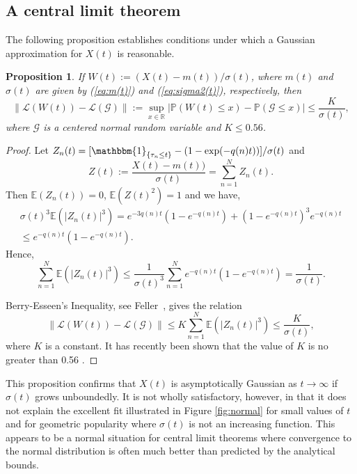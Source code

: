 \documentclass{amsart}
\newtheorem{proposition}{Proposition}
\def\R{{\mathbb R}}
\def\P{{\mathbb P}}
\def\E{{\mathbb E}}
\def\cal{\mathcal}
\newcommand\ind[1]{\mathbbm{1}_{\left\{#1\right\}}}
\begin{document}
\subsection{A central limit theorem}

The following proposition establishes conditions under which a Gaussian approximation for $X(t)$ is reasonable. 

\begin{proposition}\label{Central} If 
$W(t){:=}\left(X(t)-m(t)\right)/\sigma(t)$, where $m(t)$ and  $\sigma(t)$ are given by (\ref{eq:m(t)}) and (\ref{eq:sigma2(t)}), respectively, then
\[
\|{\cal L}(W(t))-{\cal L}({\cal G})\|  {:=}\sup_{x\in\R} \left|\P(W(t)\leq x) {-}\P({\cal G}\leq x)\right| 
  {\leq}  \frac{K}{\sigma(t)},
\]
where ${\cal G}$ is a centered normal random variable and $K\le0.56$.
\end{proposition}

\begin{proof}
Let  $Z_n(t)=[\ind{\tau_n\leq t}- (1 - \exp(-q(n)t))]/\sigma(t)$ and
\[
Z(t) {:=} \frac{X(t)-m(t))}{\sigma(t)} = \sum_{n=1}^N Z_n(t).
\]
Then $\E(Z_n(t))=0$,  $\E(Z(t)^2)=1$ and we have,
\begin{multline*}
\sigma(t)^{3} \E\left(|Z_n(t)|^3\right){=} e^{-3q(n) t}(1{-}e^{-q(n) t}){+}(1{-}e^{-q(n) t})^3e^{-q(n) t}
\\\leq e^{-q(n) t}(1-e^{-q(n) t}).
\end{multline*}
Hence,
\[
\sum_{n=1}^{N} \E\left(|Z_n(t)|^3\right)\leq 
\frac{1}{\sigma(t)^{3}}  \sum_{n=1}^{N}e^{-q(n) t}(1-e^{-q(n) t})= \frac{1}{\sigma(t)}.
\]

Berry-Esseen's Inequality, see Feller~\cite[p.~544]{Feller}, gives  the relation
\[
\|{\cal L}(W(t))-{\cal L}({\cal G})\|\leq K \sum_{n=1}^{N}\E(|Z_n(t)|^3)\leq\frac{K}{\sigma(t)},
\]
where $K$ is a constant. It has recently been shown that the value of $K$ is no greater than 0.56 \cite{Shevstova2010}.
\end{proof}

This proposition confirms that $X(t)$ is asymptotically Gaussian as $t\to \infty$ if $\sigma(t)$ grows unboundedly. It is not wholly satisfactory, however, in that it does not explain the excellent fit illustrated in Figure \ref{fig:normal} for small values of $t$ and for geometric popularity where $\sigma(t)$ is not an increasing function. This appears to be a normal situation for central limit theorems where convergence to the normal distribution is often much better than predicted by the analytical bounds.
\end{document}
